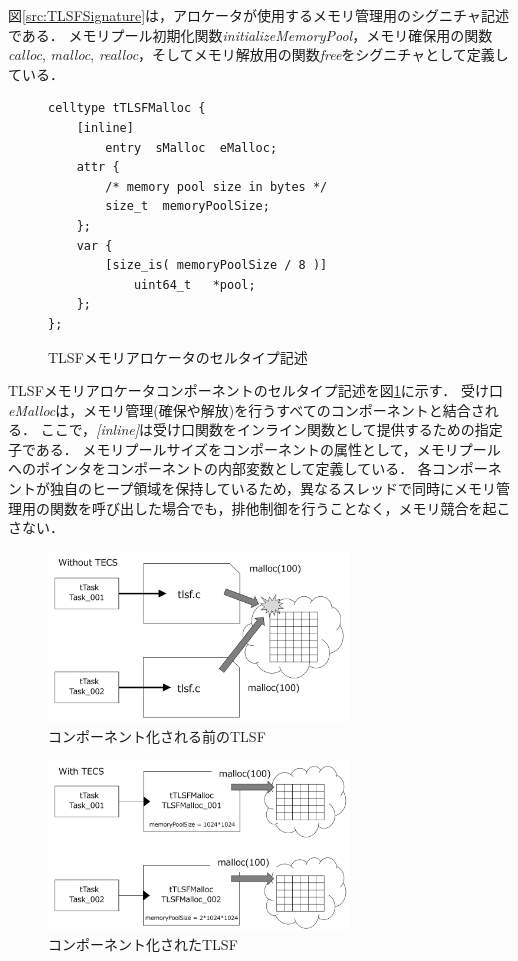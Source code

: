 \documentclass[submit,techrep]{ipsj_v2/UTF8/ipsj}
\begin{document}
図\ref{src:TLSFSignature}は，アロケータが使用するメモリ管理用のシグニチャ記述である．
メモリプール初期化関数{\it initializeMemoryPool}，メモリ確保用の関数{\it calloc}, {\it malloc}, {\it realloc}，そしてメモリ解放用の関数{\it free}をシグニチャとして定義している．

\begin{figure}[t]
\centering
\begin{lstlisting}
celltype tTLSFMalloc {
    [inline]
        entry  sMalloc  eMalloc;
    attr {
        /* memory pool size in bytes */
        size_t  memoryPoolSize;
    };
    var {
        [size_is( memoryPoolSize / 8 )]
            uint64_t   *pool;
    };
};
\end{lstlisting}
\caption{TLSFメモリアロケータのセルタイプ記述}  
\label{src:TLSFCelltype}
\end{figure}


TLSFメモリアロケータコンポーネントのセルタイプ記述を図\ref{src:TLSFCelltype}に示す．
受け口{\it eMalloc}は，メモリ管理(確保や解放)を行うすべてのコンポーネントと結合される．
ここで，{\it [inline]}は受け口関数をインライン関数として提供するための指定子である．
メモリプールサイズをコンポーネントの属性として，メモリプールへのポインタをコンポーネントの内部変数として定義している．
各コンポーネントが独自のヒープ領域を保持しているため，異なるスレッドで同時にメモリ管理用の関数を呼び出した場合でも，排他制御を行うことなく，メモリ競合を起こさない．

\begin{figure}[t]
    \centering
    \includegraphics[width=8cm,clip]{figure/WithoutTECS.pdf}
    \caption{コンポーネント化される前のTLSF}
    \label{fig:WithoutTECS}
\end{figure}

\begin{figure}[t]
    \centering
    \includegraphics[width=8cm,clip]{figure/WithTECS.pdf}
    \caption{コンポーネント化されたTLSF}
    \label{fig:WithTECS}
\end{figure}
\end{document}

